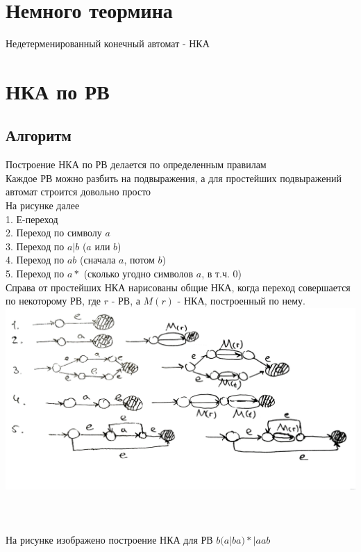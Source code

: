 \documentclass[14pt]{extreport}
\begin{document}
	\chapter{Немного теормина}
	Недетерменированный конечный автомат - НКА
	\newpage
	
	\chapter{НКА по РВ}
	\section*{Алгоритм}
	Построение НКА по РВ делается по определенным правилам\\
	Каждое РВ можно разбить на подвыражения, а для простейших подвыражений автомат строится
	довольно просто\\
	На рисунке далее\\
	1. Е-переход\\
	2. Переход по символу $a$\\
	3. Переход по $a|b$ ($a$ или $b$)\\
	4. Переход по $ab$ (сначала $a$, потом $b$)\\
	5. Переход по $a*$ (сколько угодно символов $a$, в т.ч. 0)\\
	Справа от простейших НКА нарисованы общие НКА, когда переход совершается
	по некоторому РВ, где $r$ - РВ, а $M(r)$ - НКА, построенный по нему.\\
	\includegraphics[scale=0.13]{data/pic1_1.png}\\\\\\\\
	На рисунке изображено построение НКА для РВ $b(a|ba)*|aab$\\
\end{document}
